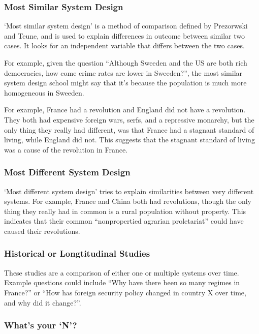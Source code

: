
\subsubsection{Most Similar System Design}

`Most similar system design' is a method of comparison defined by
Prezorwski and Teune, and is used to explain differences in outcome
between similar two cases. It looks for an independent variable that
differs between the two cases.

For example, given the question ``Although Sweeden and the US are both
rich democracies, how come crime rates are lower in Sweeden?'', the
most similar system design school might say that it's because the
population is much more homogeneous in Sweeden.

For example, France had a revolution and England did not have a
revolution. They both had expensive foreign wars, serfs, and a
repressive monarchy, but the only thing they really had different, was
that France had a stagnant standard of living, while England did
not. This suggests that the stagnant standard of living was a cause of
the revolution in France.

\subsubsection{Most Different System Design}

`Most different system design' tries to explain similarities between
very different systems. For example, France and China both had
revolutions, though the only thing they really had in common is a
rural population without property. This indicates that their common
``nonpropertied agrarian proletariat'' could have caused their
revolutions.

\subsubsection{Historical or Longtitudinal Studies}

These studies are a comparison of either one or multiple systems over
time. Example questions could include ``Why have there been so many
regimes in France?'' or ``How has foreign security policy changed in
country X over time, and why did it change?''.

\subsubsection{What's your `N'?}

